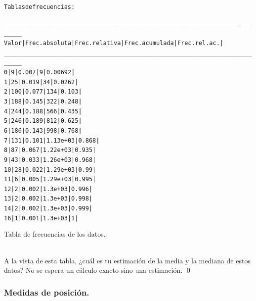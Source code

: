 \documentclass[10pt,a4paper]{article}\usepackage[]{graphicx}\usepackage[]{color}
\makeatletter
\newenvironment{kframe}{%
 \def\at@end@of@kframe{}%
 \ifinner\ifhmode%
  \def\at@end@of@kframe{\end{minipage}}%
  \begin{minipage}{\columnwidth}%
 \fi\fi%
 \def\FrameCommand##1{\hskip\@totalleftmargin \hskip-\fboxsep
 \colorbox{shadecolor}{##1}\hskip-\fboxsep
     \hskip-\linewidth \hskip-\@totalleftmargin \hskip\columnwidth}%
 \MakeFramed {\advance\hsize-\width
   \@totalleftmargin\z@ \linewidth\hsize
   \@setminipage}}%
 {\par\unskip\endMakeFramed%
 \at@end@of@kframe}
\newenvironment{knitrout}{}{} %
\makeatother
\begin{document}
\begin{table}[t]
\begin{knitrout}
\color{fgcolor}\begin{kframe}
\begin{alltt}
Tablas de frecuencias:

___________________________________________________________________________
Valor | Frec. absoluta | Frec. relativa | Frec. acumulada | Frec. rel. ac. |
___________________________________________________________________________
    0 |              9 |          0.007 |               9 |        0.00692 |
    1 |             25 |          0.019 |              34 |         0.0262 |
    2 |            100 |          0.077 |             134 |          0.103 |
    3 |            188 |          0.145 |             322 |          0.248 |
    4 |            244 |          0.188 |             566 |          0.435 |
    5 |            246 |          0.189 |             812 |          0.625 |
    6 |            186 |          0.143 |             998 |          0.768 |
    7 |            131 |          0.101 |        1.13e+03 |          0.868 |
    8 |             87 |          0.067 |        1.22e+03 |          0.935 |
    9 |             43 |          0.033 |        1.26e+03 |          0.968 |
   10 |             28 |          0.022 |        1.29e+03 |           0.99 |
   11 |              6 |          0.005 |        1.29e+03 |          0.995 |
   12 |              2 |          0.002 |         1.3e+03 |          0.996 |
   13 |              2 |          0.002 |         1.3e+03 |          0.998 |
   14 |              2 |          0.002 |         1.3e+03 |          0.999 |
   16 |              1 |          0.001 |         1.3e+03 |              1 |
\end{alltt}
\end{kframe}
\end{knitrout}
\caption{Tabla de frecuencias de los datos.}
\label{tabla:frecuenciasDatos}
\end{table}

\begin{ejercicio}
\label{tut02:ejercicio25}
\quad\\
A la vista de esta tabla, ¿cuál es tu estimación de la media y la mediana de estos datos? No se espera un cálculo exacto sino una estimación.
\qed
\end{ejercicio}

\subsubsection*{Medidas de posición.}
\label{tut02:subsubsec:medidasPosicion}
\end{document}
